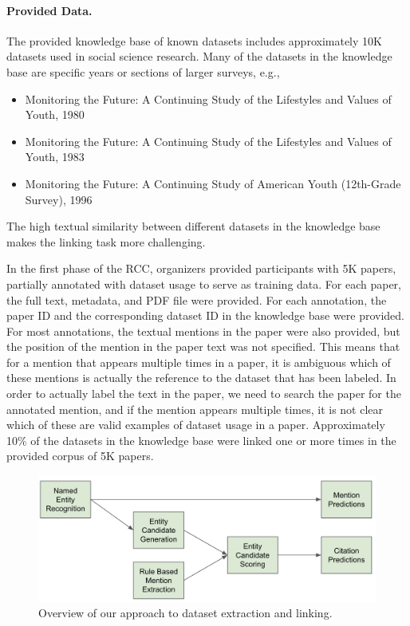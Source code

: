 \documentclass[11pt]{article}
\begin{document}
\paragraph{Provided Data.}
The provided knowledge base of known datasets includes approximately 10K datasets used in social science research.
Many of the datasets in the knowledge base are specific years or sections of larger surveys, e.g.,
\begin{itemize}
    \item  Monitoring the Future: A Continuing Study of the Lifestyles and Values of Youth, 1980 
    \item Monitoring the Future: A Continuing Study of the Lifestyles and Values of Youth, 1983
    \item Monitoring the Future: A Continuing Study of American Youth (12th-Grade Survey), 1996
\end{itemize}
The high textual similarity between different datasets in the knowledge base makes the linking task more challenging.

In the first phase of the RCC, organizers provided participants with 5K papers, partially annotated with dataset usage to serve as training data.
For each paper, the full text, metadata, and PDF file were provided.
For each annotation, the paper ID and the corresponding dataset ID in the knowledge base were provided.
For most annotations, the textual mentions in the paper were also provided, but the position of the mention in the paper text was not specified. This means that for a mention that appears multiple times in a paper, it is ambiguous which of these mentions is actually the reference to the dataset that has been labeled. In order to actually label the text in the paper, we need to search the paper for the annotated mention, and if the mention appears multiple times, it is not clear which of these are valid examples of dataset usage in a paper.
Approximately 10\% of the datasets in the knowledge base were linked one or more times in the provided corpus of 5K papers.

\begin{figure}[h]
\centering
\includegraphics[width=13cm]{datasets.png}
\caption{Overview of our approach to dataset extraction and linking.}\label{fig:datasets}
\end{figure}
\end{document}
